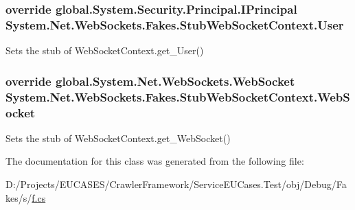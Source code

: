 \hypertarget{class_system_1_1_net_1_1_web_sockets_1_1_fakes_1_1_stub_web_socket_context_a417f26eb46f71388972b5c6ed77cdd01}{
\subsubsection[{User}]{\setlength{\rightskip}{0pt plus 5cm}override global.\-System.\-Security.\-Principal.\-I\-Principal System.\-Net.\-Web\-Sockets.\-Fakes.\-Stub\-Web\-Socket\-Context.\-User\hspace{0.3cm}{\ttfamily [get]}}}\label{class_system_1_1_net_1_1_web_sockets_1_1_fakes_1_1_stub_web_socket_context_a417f26eb46f71388972b5c6ed77cdd01}


Sets the stub of Web\-Socket\-Context.\-get\-\_\-\-User()

\hypertarget{class_system_1_1_net_1_1_web_sockets_1_1_fakes_1_1_stub_web_socket_context_a0b029e9ebbe51641276338f4e3c52c80}{
\subsubsection[{Web\-Socket}]{\setlength{\rightskip}{0pt plus 5cm}override global.\-System.\-Net.\-Web\-Sockets.\-Web\-Socket System.\-Net.\-Web\-Sockets.\-Fakes.\-Stub\-Web\-Socket\-Context.\-Web\-Socket\hspace{0.3cm}{\ttfamily [get]}}}\label{class_system_1_1_net_1_1_web_sockets_1_1_fakes_1_1_stub_web_socket_context_a0b029e9ebbe51641276338f4e3c52c80}


Sets the stub of Web\-Socket\-Context.\-get\-\_\-\-Web\-Socket()



The documentation for this class was generated from the following file\-:\begin{DoxyCompactItemize}
\item 
D\-:/\-Projects/\-E\-U\-C\-A\-S\-E\-S/\-Crawler\-Framework/\-Service\-E\-U\-Cases.\-Test/obj/\-Debug/\-Fakes/s/\hyperlink{s_2f_8cs}{f.\-cs}\end{DoxyCompactItemize}
